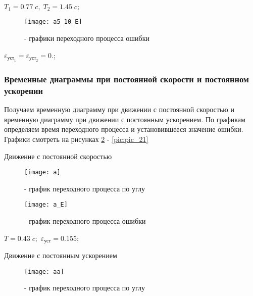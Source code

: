 \begin{center}
$T_1 = 0.77\;c,\;T_2 =1.45\;c ;$
\end{center}

\begin{figure}[H]
	\begin{center}
		\texttt{[image: a5\_10\_E]}
		\caption{- графики переходного процесса ошибки} 
		\label{pic:pic_17} %
	\end{center}
\end{figure}

\begin{center}
$\varepsilon_{\text{уст}_1}=\varepsilon_{\text{уст}_2}=0.$;
\end{center}

\subsubsection{Временные диаграммы при постоянной скорости и постоянном ускорении}
Получаем временную диаграмму при движении с постоянной скоростью и временную диаграмму при движении с постоянным ускорением. По графикам определяем время переходного процесса и установившееся значение ошибки. Графики смотреть на рисунках \ref{pic:pic_18} - \ref{pic:pic_21}

Движение с постоянной скоростью\\

\begin{figure}[H]
	\begin{center}
		\texttt{[image: a]}
		\caption{- график переходного процесса по углу} 
		\label{pic:pic_18} %
	\end{center}
\end{figure}

\begin{figure}[H]
	\begin{center}
		\texttt{[image: a\_E]}
		\caption{- график переходного процесса ошибки} 
		\label{pic:pic_19} %
	\end{center}
\end{figure}

\begin{center}
$T = 0.43\;c;$
$\varepsilon_{\text{уст}}=0.155$;
\end{center}

Движение с постоянным ускорением\\

\begin{figure}[H]
	\begin{center}
		\texttt{[image: aa]}
		\caption{- график переходного процесса по углу} 
		\label{pic:pic_20} %
	\end{center}
\end{figure}


